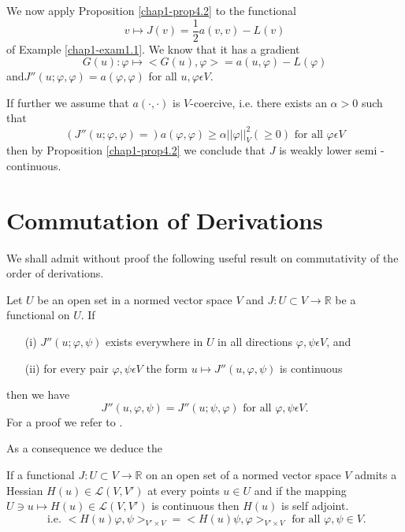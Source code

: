 We now apply Proposition \ref{chap1-prop4.2} to the functional
$$
v \mapsto J(v) = \frac{1}{2} a(v, v) - L(v)
$$
of Example \ref{chap1-exam1.1}. We know that it has a gradient
$$
G(u) : \varphi \mapsto <G(u), \varphi> = a(u, \varphi) - L(\varphi)
$$
and\pageoriginale $J''(u; \varphi, \varphi) = a(\varphi, \varphi)$ for all $u, \varphi \epsilon V$.

If further we assume that $a(\cdot ,\cdot)$ is $V$-coercive, i.e. there exists an $\alpha > 0$ such that
$$
(J''(u ; \varphi, \varphi) =) a(\varphi, \varphi) \geq \alpha||\varphi||_{V}^{2} (\geq 0) \text{ for all } \varphi \epsilon V
$$
then by Proposition \ref{chap1-prop4.2} we conclude that $J$ is weakly
lower semi - continuous.

\section{Commutation of Derivations}\label{chap1-sec5}
We shall admit without proof the following useful result on commutativity of the order of derivations.

\begin{theorem}\label{chap1-thm5.1}
Let $U$ be an open set in a normed vector space $V$ and $J : U \subset V \to \mathbb{R}$ be a functional on $U$. If
\begin{enumerate}
\item[(i)] $J''(u; \varphi, \psi)$ exists everywhere in $U$ in all directions $\varphi, \psi \epsilon V$, and

\item[(ii)] for every pair $\varphi, \psi \epsilon V$ the form $u \mapsto J''(u, \varphi, \psi)$ is continuous
\end{enumerate}
then we have
$$
J''(u, \varphi, \psi) = J''(u; \psi, \varphi) \text{ for all } \varphi, \psi \epsilon V.
$$
For a proof we refer to \cite{key12}.
\end{theorem}

As a consequence we deduce the

\begin{corollary}\label{chap1-coro5.2}
If a functional $J : U \subset V \to \mathbb{R}$ on an open set of a normed vector space $V$ admits a Hessian $H(u) \in \mathscr{L} (V, V')$ at every points $u \in U$ and if the mapping $U \ni u \mapsto H(u) \in \mathscr{L} (V, V')$ is continuous then $H(u)$ is self adjoint.
$$
\text{ i.e. } <H(u) \varphi, \psi>_{V' \times V} = <H(u) \psi, \varphi>_{V' \times V} \text{ for all } \varphi, \psi \in V.
$$
\end{corollary}

